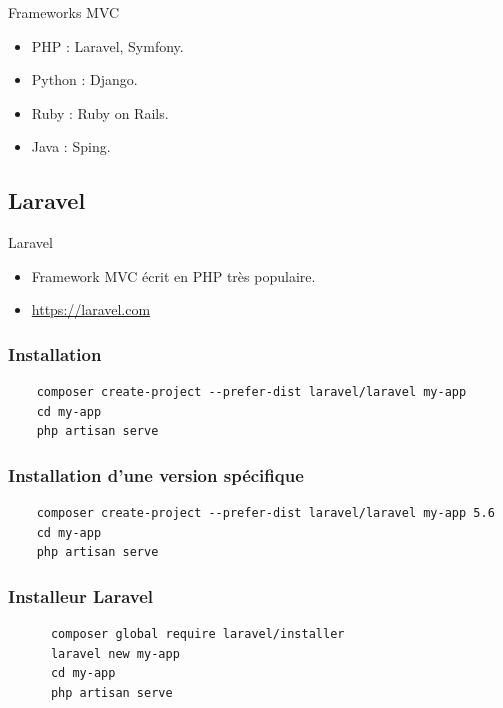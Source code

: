 \documentclass{beamer}
\begin{document}
\begin{frame}{Frameworks MVC}
\begin{itemize}
  \item PHP : Laravel, Symfony.
  \item Python : Django.
  \item Ruby : Ruby on Rails.
  \item Java : Sping.
\end{itemize}
\end{frame}

\subsection{Laravel}
\begin{frame}{Laravel}
\begin{itemize}
  \item Framework MVC écrit en PHP très populaire.
  \item \url{https://laravel.com}
\end{itemize}
\end{frame}

\begin{frame}[fragile]
\frametitle{Installation}
\begin{footnotesize}
  \begin{Verbatim}
    composer create-project --prefer-dist laravel/laravel my-app
    cd my-app
    php artisan serve
  \end{Verbatim}
\end{footnotesize}
\end{frame}

\begin{frame}[fragile]
\frametitle{Installation d'une version spécifique}
\begin{footnotesize}
  \begin{Verbatim}
    composer create-project --prefer-dist laravel/laravel my-app 5.6
    cd my-app
    php artisan serve
  \end{Verbatim}
\end{footnotesize}
\end{frame}

\begin{frame}[fragile]
  \frametitle{Installeur Laravel}
  \begin{footnotesize}
    \begin{Verbatim}
      composer global require laravel/installer
      laravel new my-app
      cd my-app
      php artisan serve
    \end{Verbatim}
  \end{footnotesize}
\end{frame}
\end{document}
